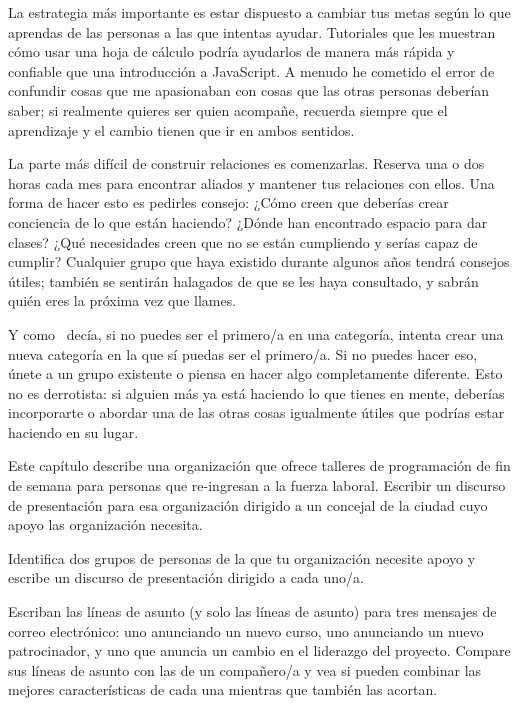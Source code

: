 La estrategia más importante es
estar dispuesto a cambiar tus metas
según lo que aprendas de las personas a las que intentas ayudar.
Tutoriales que les muestran cómo usar una hoja de cálculo
podría ayudarlos de manera más rápida y confiable que
una introducción a JavaScript.
A menudo he cometido el error de confundir cosas que me apasionaban
con cosas que las otras personas deberían saber;
si realmente quieres ser quien acompañe,
recuerda siempre que el aprendizaje y el cambio tienen que ir en ambos sentidos.

La parte más difícil de construir relaciones es comenzarlas.
Reserva una o dos horas cada mes
para encontrar aliados y mantener tus relaciones con ellos.
Una forma de hacer esto es pedirles consejo:
¿Cómo creen que deberías crear conciencia de lo que están haciendo?
¿Dónde han encontrado espacio para dar clases?
¿Qué necesidades creen que no se están cumpliendo
y serías capaz de cumplir?
Cualquier grupo que haya existido durante algunos años tendrá consejos útiles;
también se sentirán halagados de que se les haya consultado,
y sabrán quién eres la próxima vez que llames.


Y como~\cite{Kuch2011} decía,
si no puedes ser el primero/a en una categoría,
intenta crear una nueva categoría en la que sí  puedas ser el primero/a.
Si no puedes hacer eso,
únete a un grupo existente o piensa en hacer algo completamente diferente.
Esto no es derrotista:
si alguien más ya está haciendo lo que tienes en mente,
deberías incorporarte o abordar una de las otras cosas igualmente útiles
que podrías estar haciendo en su lugar.



Este capítulo describe una organización
que ofrece talleres de programación de fin de semana para personas que re-ingresan a la fuerza laboral.
Escribir un discurso de presentación para esa organización
dirigido a un concejal de la ciudad cuyo apoyo las organización necesita.



Identifica dos grupos de personas de la que tu organización necesite apoyo
y escribe un discurso de presentación dirigido a cada uno/a.



Escriban las líneas de asunto (y solo las líneas de asunto) para tres mensajes de correo electrónico:
uno anunciando un nuevo curso,
uno anunciando un nuevo patrocinador,
y uno que anuncia un cambio en el liderazgo del proyecto.
Compare sus líneas de asunto con las de un compañero/a
y vea si pueden combinar las mejores características de cada una mientras que también las acortan.

